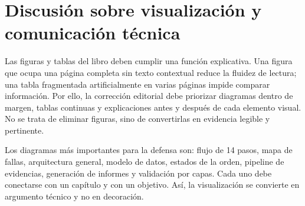 \section{Discusión sobre visualización y comunicación técnica}
\label{sec:discusion-visualizacion-comunicacion}

Las figuras y tablas del libro deben cumplir una función explicativa. Una figura que ocupa una página completa sin texto contextual reduce la fluidez de lectura; una tabla fragmentada artificialmente en varias páginas impide comparar información. Por ello, la corrección editorial debe priorizar diagramas dentro de margen, tablas continuas y explicaciones antes y después de cada elemento visual. No se trata de eliminar figuras, sino de convertirlas en evidencia legible y pertinente.

Los diagramas más importantes para la defensa son: flujo de 14 pasos, mapa de fallas, arquitectura general, modelo de datos, estados de la orden, pipeline de evidencias, generación de informes y validación por capas. Cada uno debe conectarse con un capítulo y con un objetivo. Así, la visualización se convierte en argumento técnico y no en decoración.
